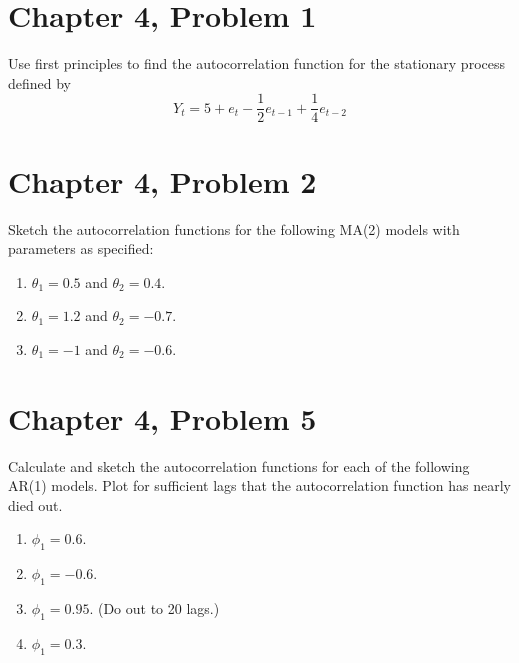 \documentclass[11pt]{article}
\newif\ifclearpage
\newcommand{\problem}[1]{\section*{#1}}
\newcommand{\solution}{\hrulefill}
\newcommand{\maybeclearpage}{\ifclearpage\clearpage\fi}
\begin{document}
\maybeclearpage
\problem{Chapter 4, Problem 1}
Use first principles to find the autocorrelation function for the stationary process defined by $$ Y_t = 5 + e_t - \frac{1}{2}e_{t-1} + \frac{1}{4}e_{t-2} $$

\solution


\maybeclearpage
\problem{Chapter 4, Problem 2}
Sketch the autocorrelation functions for the following MA(2) models with parameters as specified:
\begin{enumerate}
	\item $\theta_1 = 0.5$ and $\theta_2 = 0.4$.
	\item $\theta_1 = 1.2$ and $\theta_2 = -0.7$.
	\item $\theta_1 = -1$ and $\theta_2 = -0.6$.
\end{enumerate}

\solution

\maybeclearpage
\problem{Chapter 4, Problem 5}
Calculate and sketch the autocorrelation functions for each of the following AR(1) models. Plot for sufficient lags that the autocorrelation function has nearly died out.
\begin{enumerate}
	\item $\phi_1 = 0.6$.
	\item $\phi_1 = -0.6$.
	\item $\phi_1 = 0.95$. (Do out to 20 lags.)
	\item $\phi_1 = 0.3$.
\end{enumerate}

\solution

\maybeclearpage
\end{document}
